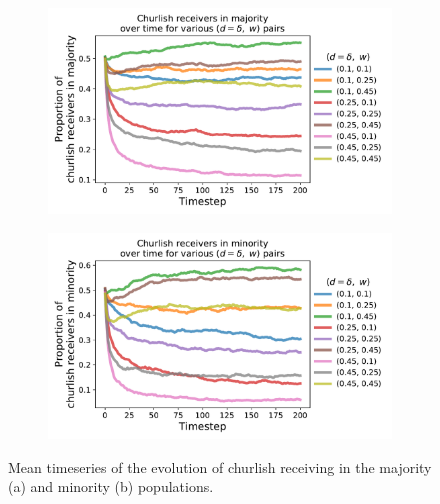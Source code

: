 \documentclass[11pt,letterpaper]{article}
\begin{document}
\begin{figure}[H]
  \centering
  \begin{subfigure}{0.49\textwidth}
    \centering
    \includegraphics[width=\textwidth]{prelim/Figures/churlish_series_majority_025.pdf}
    \caption{}
    \label{fig:}
  \end{subfigure}
  \begin{subfigure}{0.49\textwidth}
    \centering
    \includegraphics[width=\textwidth]{prelim/Figures/churlish_series_minority_025.pdf}
    \caption{}
    \label{fig:}
  \end{subfigure}
  \caption{Mean timeseries of the evolution of churlish receiving in the
    majority (a) and minority (b) populations.}
  \label{fig:regressions}
\end{figure}
\end{document}
